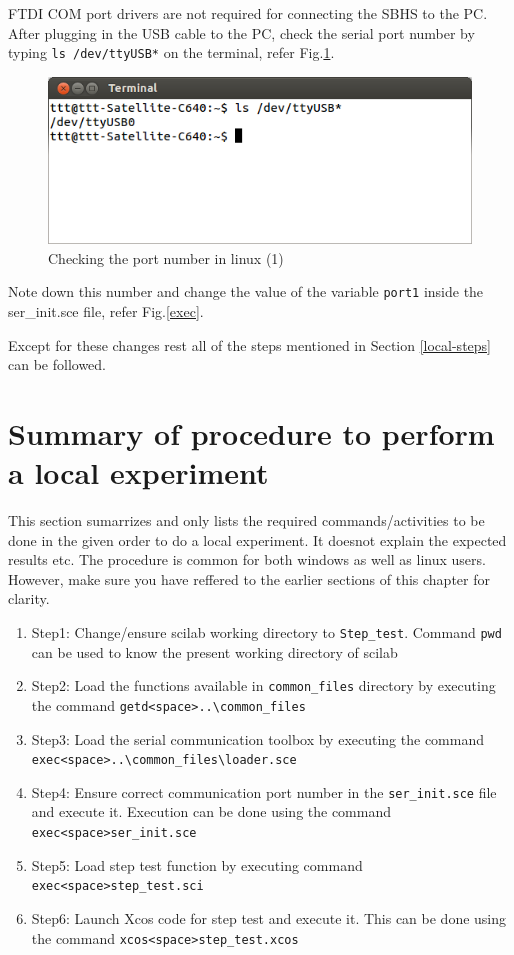 FTDI COM port drivers are not required for connecting the SBHS to the PC. After plugging in the USB cable to the PC, check the serial port number by typing {\tt ls /dev/ttyUSB*} on the terminal, refer Fig.\ref{lstty}.
\begin{figure}
\centering
\includegraphics[width=0.7\linewidth]{using-sbhs/lstty.png}
\caption{Checking the port number in linux (1)}
\label{lstty}
\end{figure}

Note down this number and change the value of the variable {\tt port1} inside the {ser\_init.sce} file, refer Fig.\ref{exec}. 

 Except for these changes rest all of the steps mentioned in Section \ref{local-steps} can be followed.
\section{Summary of procedure to perform a local experiment}\label{local-summary}
This section sumarrizes and only lists the required commands/activities to be done in the given order to do a local experiment. It doesnot explain the expected results etc. The procedure is common for both windows as well as linux users. However, make sure you have reffered to the earlier sections of this chapter for clarity.

\begin{enumerate}
\item Step1: Change/ensure scilab working directory to {\tt Step\_test}. Command {\tt pwd} can be used to know the present working directory of scilab
\item Step2: Load the functions available in {\tt common\_files} directory by executing the command {\tt getd<space>..\textbackslash common\_files\ }
\item Step3: Load the serial communication toolbox by executing the command {\tt exec<space>..\textbackslash common\_files\textbackslash loader.sce}
\item Step4: Ensure correct communication port number in the {\tt ser\_init.sce} file and execute it. Execution can be done using the command \\{\tt exec<space>ser\_init.sce}
\item Step5: Load step test function by executing command\\ {\tt exec<space>step\_test.sci}
\item Step6: Launch Xcos code for step test and execute it. This can be done using the command {\tt xcos<space>step\_test.xcos}
\end{enumerate}

